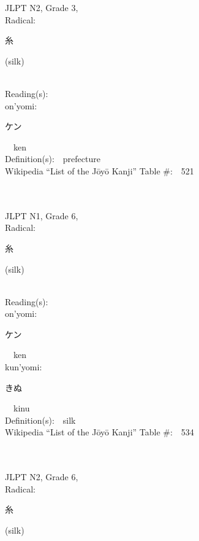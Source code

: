 \begin{multicols}{2}
{JLPT N2, Grade 3, \\Radical:\ \ {\begin{CJK}{UTF8}{min} 糸 \end{CJK}} (silk) } \\
Reading(s):\ \ \\
{\hspace*{1em}}on'yomi:\ \ \\
{\hspace*{2em}}{\begin{CJK}{UTF8}{min} ケン \end{CJK}}\ \ ken\ \ \\
Definition(s):\ \ prefecture \\
Wikipedia ``List of the J\=oy\=o Kanji'' Table \#:\ \ 521 \\
\ \ \\
{\fontsize{34pt}{40pt}  }\ \ \\  %
{JLPT N1, Grade 6, \\Radical:\ \ {\begin{CJK}{UTF8}{min} 糸 \end{CJK}} (silk) } \\
Reading(s):\ \ \\
{\hspace*{1em}}on'yomi:\ \ \\
{\hspace*{2em}}{\begin{CJK}{UTF8}{min} ケン \end{CJK}}\ \ ken\ \ \\
{\hspace*{1em}}kun'yomi:\ \ \\
{\hspace*{2em}}{\begin{CJK}{UTF8}{min} きぬ \end{CJK}}\ \ kinu\ \ \\
Definition(s):\ \ silk \\
Wikipedia ``List of the J\=oy\=o Kanji'' Table \#:\ \ 534 \\
\ \ \\
{\fontsize{34pt}{40pt}  }\ \ \\  %
{JLPT N2, Grade 6, \\Radical:\ \ {\begin{CJK}{UTF8}{min} 糸 \end{CJK}} (silk) } \\

\end{multicols}
